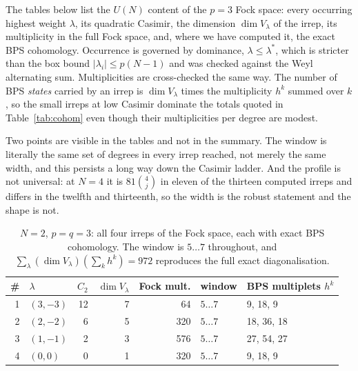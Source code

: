 \documentclass[10pt]{article}
\begin{document}
The tables below list the $U(N)$ content of the $p=3$ Fock space: every occurring highest weight $\lambda$, its
quadratic Casimir, the dimension $\dim V_\lambda$ of the irrep, its multiplicity in the full Fock space, and,
where we have computed it, the exact BPS cohomology. Occurrence is governed by dominance, $\lambda\le\lambda^*$,
which is stricter than the box bound $|\lambda_i|\le p(N-1)$ and was checked against the Weyl alternating sum.
Multiplicities are cross-checked the same way. The number of BPS \emph{states} carried by an irrep is
$\dim V_\lambda$ times the multiplicity $h^k$ summed over $k$, so the small irreps at low Casimir dominate the
totals quoted in Table~\ref{tab:cohom} even though their multiplicities per degree are modest.

Two points are visible in the tables and not in the summary. The window is literally the same set of degrees in
every irrep reached, not merely the same width, and this persists a long way down the Casimir ladder. And the
profile is not universal: at $N=4$ it is $81\binom4j$ in eleven of the thirteen computed irreps and differs in
the twelfth and thirteenth, so the width is the robust statement and the shape is not.

\begin{table}[p]\centering\small
\begin{tabular}{rlrrrll}
\toprule
\# & $\lambda$ & $C_2$ & $\dim V_\lambda$ & Fock mult. & window & BPS multiplets $h^k$\\
\midrule
1 & $(3,-3)$ & 12 & 7 & 64 & $5\ldots7$ & 9, 18, 9\\
2 & $(2,-2)$ & 6 & 5 & 320 & $5\ldots7$ & 18, 36, 18\\
3 & $(1,-1)$ & 2 & 3 & 576 & $5\ldots7$ & 27, 54, 27\\
4 & $(0,0)$ & 0 & 1 & 320 & $5\ldots7$ & 9, 18, 9\\
\bottomrule\end{tabular}
\caption{$N=2$, $p=q=3$: all four irreps of the Fock space, each with exact BPS cohomology. The window is $5\ldots7$ throughout, and $\sum_\lambda(\dim V_\lambda)(\sum_kh^k)=972$ reproduces the full exact diagonalisation.}\label{tab:app2}
\end{table}
\end{document}
